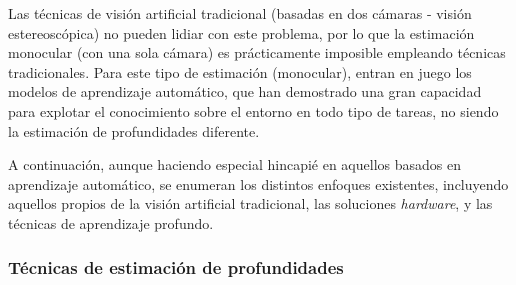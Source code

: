 Las técnicas de visión artificial tradicional (basadas en dos cámaras - visión estereoscópica) no pueden lidiar con este problema, por lo que la estimación monocular (con una sola cámara) es prácticamente imposible empleando técnicas tradicionales. Para este tipo de estimación (monocular), entran en juego los modelos de aprendizaje automático, que han demostrado una gran capacidad para explotar el conocimiento sobre el entorno en todo tipo de tareas, no siendo la estimación de profundidades diferente. 

A continuación, aunque haciendo especial hincapié en aquellos basados en aprendizaje automático, se enumeran los distintos enfoques existentes, incluyendo aquellos propios de la visión artificial tradicional, las soluciones \textit{hardware}, y las técnicas de aprendizaje profundo.

\subsubsection{Técnicas de estimación de profundidades} \label{estimacion-profundidades-sota}

